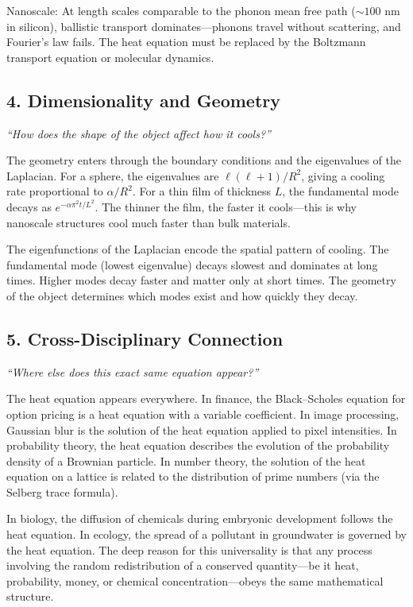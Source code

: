 Nanoscale: At length scales comparable to the phonon mean free path ($\sim 100$ nm in silicon), ballistic transport dominates---phonons travel without scattering, and Fourier's law fails. The heat equation must be replaced by the Boltzmann transport equation or molecular dynamics.

\subsection*{4. Dimensionality and Geometry}
\textit{``How does the shape of the object affect how it cools?''}

The geometry enters through the boundary conditions and the eigenvalues of the Laplacian. For a sphere, the eigenvalues are $\ell(\ell+1)/R^2$, giving a cooling rate proportional to $\alpha/R^2$. For a thin film of thickness $L$, the fundamental mode decays as $e^{-\alpha\pi^2 t/L^2}$. The thinner the film, the faster it cools---this is why nanoscale structures cool much faster than bulk materials.

The eigenfunctions of the Laplacian encode the spatial pattern of cooling. The fundamental mode (lowest eigenvalue) decays slowest and dominates at long times. Higher modes decay faster and matter only at short times. The geometry of the object determines which modes exist and how quickly they decay.

\subsection*{5. Cross-Disciplinary Connection}
\textit{``Where else does this exact same equation appear?''}

The heat equation appears everywhere. In finance, the Black--Scholes equation for option pricing is a heat equation with a variable coefficient. In image processing, Gaussian blur is the solution of the heat equation applied to pixel intensities. In probability theory, the heat equation describes the evolution of the probability density of a Brownian particle. In number theory, the solution of the heat equation on a lattice is related to the distribution of prime numbers (via the Selberg trace formula).

In biology, the diffusion of chemicals during embryonic development follows the heat equation. In ecology, the spread of a pollutant in groundwater is governed by the heat equation. The deep reason for this universality is that any process involving the random redistribution of a conserved quantity---be it heat, probability, money, or chemical concentration---obeys the same mathematical structure.

